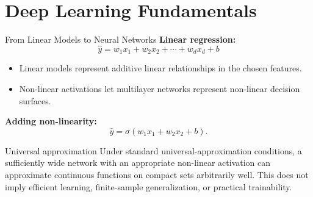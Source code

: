 %
%

\section{Deep Learning Fundamentals}


\begin{frame}{From Linear Models to Neural Networks}
\textbf{Linear regression:}
\[
  \hat{y} = w_1 x_1 + w_2 x_2 + \cdots + w_d x_d + b
\]

\begin{itemize}
  \item Linear models represent additive linear relationships in the chosen features.
  \item Non-linear activations let multilayer networks represent non-linear decision surfaces.
\end{itemize}

\textbf{Adding non-linearity:}
\[
  \hat{y} = \sigma(w_1 x_1 + w_2 x_2 + b).
\]

\begin{alertblock}{Universal approximation}
Under standard universal-approximation conditions, a sufficiently wide network with an appropriate non-linear activation can approximate continuous functions on compact sets arbitrarily well. This does not imply efficient learning, finite-sample generalization, or practical trainability.
\end{alertblock}
\end{frame}

